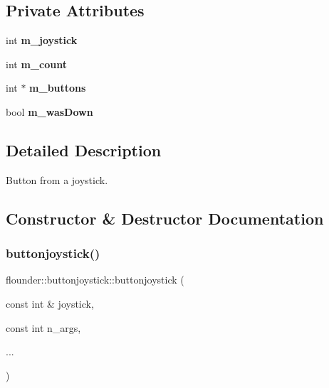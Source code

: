 \subsection*{Private Attributes}
\begin{DoxyCompactItemize}
\item 
\mbox{\label{classflounder_1_1buttonjoystick_a3a6e21dff8b11ac6a58cfae4d33093ab}} 
int {\bfseries m\+\_\+joystick}
\item 
\mbox{\label{classflounder_1_1buttonjoystick_a2fa5decb08acdaf813707747bfccccd9}} 
int {\bfseries m\+\_\+count}
\item 
\mbox{\label{classflounder_1_1buttonjoystick_ad7f15d3fc515ec73cbbb755883c5dd0e}} 
int $\ast$ {\bfseries m\+\_\+buttons}
\item 
\mbox{\label{classflounder_1_1buttonjoystick_a2338ec61fb31f2299d7373faedf33d24}} 
bool {\bfseries m\+\_\+was\+Down}
\end{DoxyCompactItemize}


\subsection{Detailed Description}
Button from a joystick. 



\subsection{Constructor \& Destructor Documentation}
\mbox{\label{classflounder_1_1buttonjoystick_a1b31996ff3588c033e85839aef2d35c8}} 
\subsubsection{\texorpdfstring{buttonjoystick()}{buttonjoystick()}}
{\footnotesize\ttfamily flounder\+::buttonjoystick\+::buttonjoystick (\begin{DoxyParamCaption}\item[{const int \&}]{joystick,  }\item[{const int}]{n\+\_\+args,  }\item[{}]{... }\end{DoxyParamCaption})\hspace{0.3cm}{\ttfamily [inline]}}



